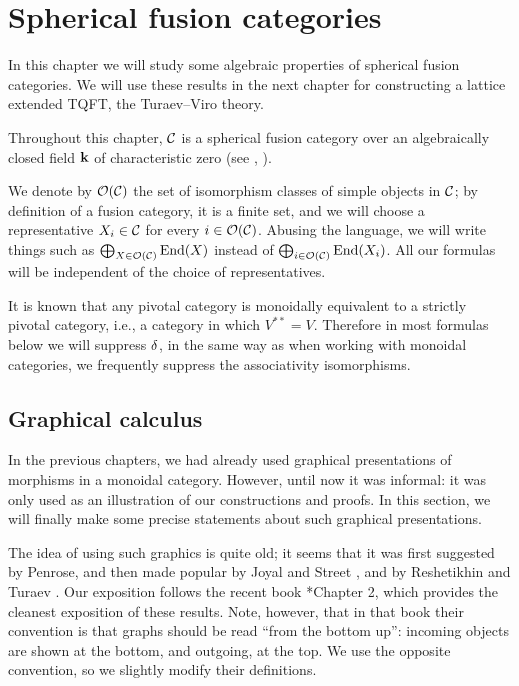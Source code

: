 \chapter{Spherical fusion categories}\label{c:spherical}

In this chapter we will study some algebraic properties of spherical fusion
categories. We will use these results in the next chapter for constructing
a lattice extended TQFT, the Turaev--Viro theory.

Throughout this chapter, $\mathcal{C}$ is a spherical fusion category over an
algebraically closed field $\mathbf{k}$ of characteristic zero (see ,
).

We denote by $\mathcal{O}(\mathcal{C})$ the set of isomorphism classes of simple objects in $\mathcal{C}$;
by definition of a fusion category, it is a finite set, and we will choose a
representative $X_i\in \mathcal{C}$ for every $i\in \mathcal{O}(\mathcal{C})$. Abusing the language, we
will write things such as $\bigoplus_{X\in \mathcal{O}(\mathcal{C})} \operatorname{End}(X)$ instead of
$\bigoplus_{i\in \mathcal{O}(\mathcal{C})}\operatorname{End}(X_i)$. All our formulas will be independent of the
choice of representatives.

It is known that any pivotal category is monoidally equivalent to a strictly
pivotal category, i.e., a category in which $V^{**}=V$. Therefore in most
formulas below we will suppress $\delta$, in the same way as when working with
monoidal categories, we frequently suppress the associativity isomorphisms.



\section{Graphical calculus}\label{s:graphical}
In the previous chapters, we had already used graphical presentations
of morphisms in a monoidal category. However, until now it was informal:
it was only used as an illustration of our constructions and proofs.
In this section, we will finally make some precise statements about such
graphical presentations.

The idea of using such graphics is quite old; it seems that it was first
suggested by Penrose, and then made popular by Joyal and Street
,  and by Reshetikhin and Turaev
. Our exposition follows the recent book
*{Chapter 2}, which provides the cleanest exposition
of these results. Note, however, that in that book their convention is that
graphs should be read ``from the bottom up'': incoming objects are shown at the
bottom, and outgoing, at the top. We use the opposite convention, so we
slightly modify their definitions.

